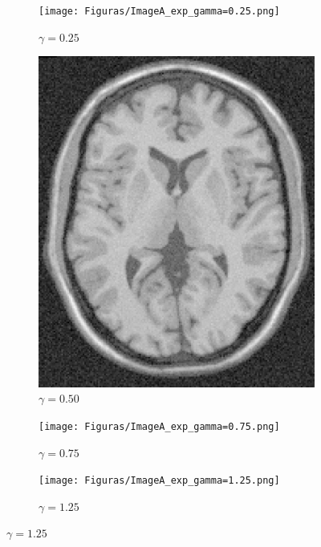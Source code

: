 \documentclass[11pt,twocolumn,twoside]{opticajnl}
\begin{document}
\begin{figure}[H]
    \centering
         \begin{subfigure}[h]{0.32\linewidth}
            \centering
            \texttt{[image: Figuras/ImageA\_exp\_gamma=0.25.png]}
            \caption{$\gamma = 0.25$} 
         \end{subfigure}
         \begin{subfigure}[h]{0.32\linewidth}
            \centering
            \includegraphics[width=\textwidth]{Figuras/ImageA_exp_gamma=0.5.png}
            \caption{$\gamma = 0.50$} 
         \end{subfigure}
         \begin{subfigure}[h]{0.32\linewidth}
            \centering
            \texttt{[image: Figuras/ImageA\_exp\_gamma=0.75.png]}
            \caption{$\gamma = 0.75$} 
         \end{subfigure}
         \begin{subfigure}[h]{0.32\linewidth}
            \centering
            \texttt{[image: Figuras/ImageA\_exp\_gamma=1.25.png]}
            \caption{$\gamma = 1.25$} 
         \end{subfigure}

\end{figure}
\end{document}
